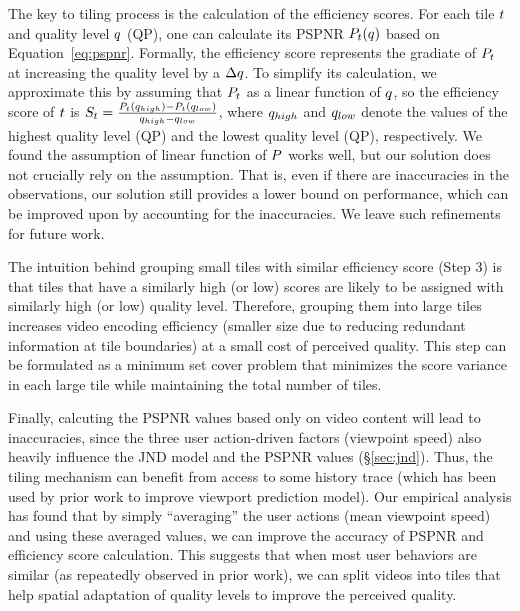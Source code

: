 The key to \name tiling process is the calculation of the efficiency scores. 
For each tile $t$ and quality level $q$ (\eg QP), one can calculate its PSPNR $P_t(q)$ based on Equation~\ref{eq:pspnr}.
Formally, the efficiency score represents the gradiate of $P_t$ at increasing the quality level by a $\Delta q$.
To simplify its calculation, we approximate this by assuming that $P_t$ as a linear function of $q$, so the efficiency score of $t$ is $S_t=\frac{P_t(q_{high})-P_t(q_{low})}{q_{high}-q_{low}}$, where $q_{high}$ and $q_{low}$ denote the values of the highest quality level (QP) and the lowest quality level (QP), respectively.
We found the assumption of linear function of $P$ works well, but our solution does not crucially rely on the assumption. 
That is, even if there are inaccuracies in the observations, our solution still provides a lower bound on performance, which can be improved upon by accounting for the inaccuracies. We leave such refinements for future work.

The intuition behind grouping small tiles with similar efficiency score (Step 3) is that tiles that have a similarly high (or low) scores are likely to be assigned with similarly high (or low) quality level. 
Therefore, grouping them into large tiles increases video encoding efficiency (\ie smaller size due to reducing redundant information at tile boundaries) at a small cost of perceived quality.
This step can be formulated as a minimum set cover problem that minimizes the score variance in each large tile while maintaining the total number of tiles.


Finally, calcuting the PSPNR values based only on video content will lead to inaccuracies, since the three user action-driven factors (\eg viewpoint speed) also heavily influence the JND model and the PSPNR values (\S\ref{sec:jnd}).
Thus, the \name tiling mechanism can benefit from access to some history trace (which has been used by prior work to improve viewport prediction model).
Our empirical analysis has found that by simply ``averaging'' the user actions (\eg mean viewpoint speed) and using these averaged values, we can improve the accuracy of PSPNR and efficiency score calculation. 
This suggests that when most \vrvideo user behaviors are similar (as repeatedly observed in prior work), we can split videos into tiles that help spatial adaptation of quality levels to improve the perceived quality.




